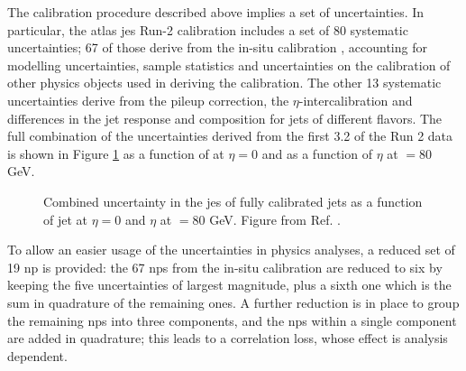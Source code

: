 The calibration procedure described above implies a set of uncertainties. In particular, 
the \gls{atlas} \gls{jes} Run-2 calibration includes a set of 80 systematic uncertainties; 
67 of those derive from the in-situ calibration \cite{PhysRevD.96.072002}, accounting for modelling uncertainties, 
sample statistics and uncertainties on the calibration of other physics objects used in deriving the calibration. 
The other 13 systematic uncertainties derive from the pileup correction, the $\eta$-intercalibration 
and differences in the jet response and composition for jets of different flavors. 
The full combination of the uncertainties derived from the first 3.2 \ifb of the Run 2 data 
is shown in Figure \ref{fig:obj:jessyst} as a function of \pt at $\eta = 0$ and as a function of $\eta$ at \pt$ = 80$ GeV.

\begin{figure}[h]
\begin{center}
\end{center}
 \caption{Combined uncertainty in the \gls{jes} of fully calibrated jets as a function of   
 jet \pt at $\eta = 0$ and  $\eta$ at \pt$ = 80$ GeV. Figure from Ref. \cite{PhysRevD.96.072002}.}
  \label{fig:obj:jessyst}
\end{figure}

To allow an easier usage of the uncertainties in physics analyses, a reduced set of 19 \gls{np} is provided: 
the 67 \glspl{np} from the in-situ calibration are reduced to six by keeping the five uncertainties of largest magnitude, 
plus a sixth one which is the sum in quadrature of the remaining ones. 
A further reduction is in place to group the remaining \glspl{np} into three components, 
and the \glspl{np} within a single component are added in quadrature; this leads to a correlation loss, whose effect is analysis dependent. 

